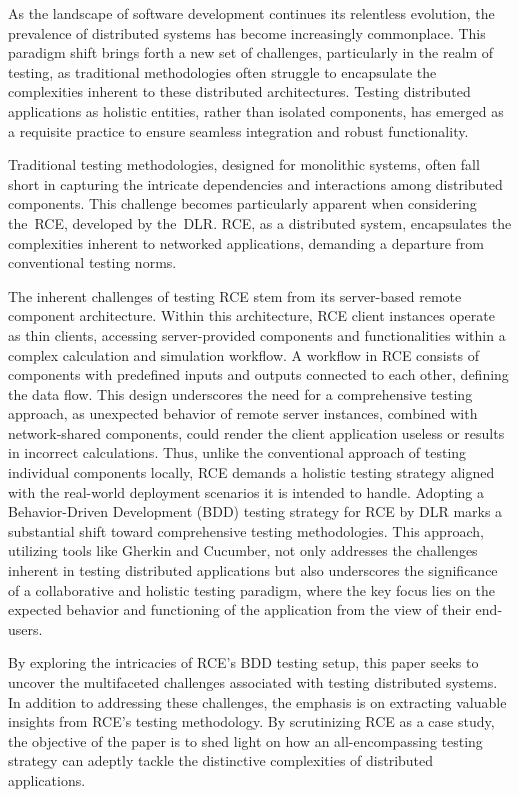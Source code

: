 As the landscape of software development continues its relentless evolution, the prevalence of distributed systems has become increasingly commonplace. This paradigm shift brings forth a new set of challenges, particularly in the realm of testing, as traditional methodologies often struggle to encapsulate the complexities inherent to these distributed architectures. Testing distributed applications as holistic entities, rather than isolated components, has emerged as a requisite practice to ensure seamless integration and robust functionality.

Traditional testing methodologies, designed for monolithic systems, often fall short in capturing the intricate dependencies and interactions among distributed components. This challenge becomes particularly apparent when considering the~\ac{RCE}, developed by the~\ac{DLR}. \ac{RCE}, as a distributed system, encapsulates the complexities inherent to networked applications, demanding a departure from conventional testing norms.

The inherent challenges of testing \ac{RCE} stem from its server-based remote component architecture. Within this architecture, \ac{RCE} client instances operate as thin clients, accessing server-provided components and functionalities within a complex calculation and simulation workflow. A workflow in \ac{RCE} consists of components with predefined inputs and outputs connected to each other, defining the data flow. This design underscores the need for a comprehensive testing approach, as unexpected behavior of remote server instances, combined with network-shared components, could render the client application useless or results in incorrect calculations. Thus, unlike the conventional approach of testing individual components locally, \ac{RCE} demands a holistic testing strategy aligned with the real-world deployment scenarios it is intended to handle. Adopting a Behavior-Driven Development (BDD) testing strategy for \ac{RCE} by \ac{DLR} marks a substantial shift toward comprehensive testing methodologies. This approach, utilizing tools like Gherkin and Cucumber, not only addresses the challenges inherent in testing distributed applications but also underscores the significance of a collaborative and holistic testing paradigm, where the key focus lies on the expected behavior and functioning of the application from the view of their end-users.

By exploring the intricacies of \ac{RCE}'s BDD testing setup, this paper seeks to uncover the multifaceted challenges associated with testing distributed systems. In addition to addressing these challenges, the emphasis is on extracting valuable insights from \ac{RCE}'s testing methodology. By scrutinizing \ac{RCE} as a case study, the objective of the paper is to shed light on how an all-encompassing testing strategy can adeptly tackle the distinctive complexities of distributed applications. 
